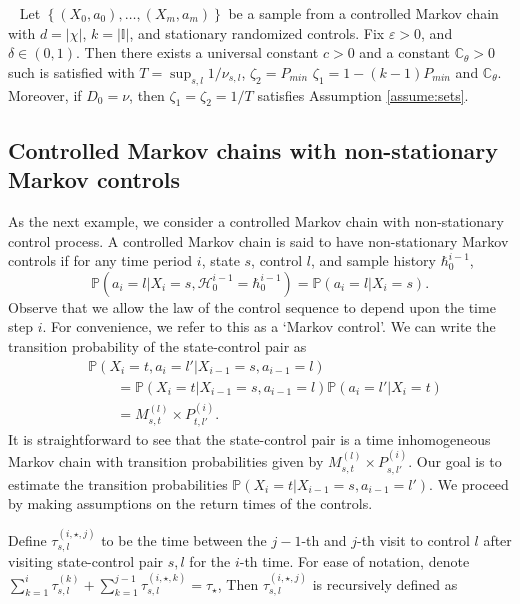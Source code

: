 \documentclass[opre,sglanonrev]{informs4}
\numberwithin{equation}{section}
\newcommand{\pow}[1]{^{(#1)}}
\newcommand{\lp}{\left(}
\newcommand{\rp}{\right)}
\newcommand{\History}{\mathcal{H}}
\newcommand{\history}{\hbar}
\newcommand{\Cbb}{\mathbb{C}}
\newcommand{\Ibb}{\mathbb{I}}
\newcommand{\Pbb}{\mathbb{P}}
\newcommand{\constant}{\Cbb}
\newcommand{\indexeddata}{\left\{(X_0,a_0),\dots,(X_m,a_m)\right\}}
\newcommand{\prob}{\Pbb}
\newcommand{\probl}{\prob}
\newcommand{\initialD}{D_0}
\newcommand{\eps}{\varepsilon}
\renewcommand{\epsilon}{\eps}
\begin{document}
{{\begin{proposition}~\label{prop:stationary-mdp}
Let $\indexeddata$ be a sample from a controlled Markov chain with $d = |\chi|$, $k = |\Ibb|$, and stationary randomized controls. 
Fix $\epsilon>0$, and $\delta \in (0,1)$. Then there exists a universal constant $c>0$ and a constant $\constant_\theta>0$ such  is satisfied with $T=\sup_{s,l} {1}/{\nu_{s,l}}$, $\zeta_2=P_{min}$ $\zeta_1=1-(k-1)P_{min}$ and $\constant_\theta$. Moreover, if $\initialD=\nu$, then $\zeta_1=\zeta_2=1/T$ satisfies Assumption \ref{assume:sets}.
\end{proposition}


\subsection{Controlled Markov chains with non-stationary Markov controls}\label{sec:exam-Markov}
As the next example, we consider a controlled Markov chain with non-stationary control process. A controlled Markov chain is said to have non-stationary Markov controls if for any time period $i$, state $s$, control $l$, and sample history $\history_0^{i-1}$,
\[
\probl\lp a_i=l|X_i=s,\History_0^{i-1}=\history_0^{i-1}\rp=\probl\lp a_i=l|X_i =s\rp.
\]
 Observe that we allow the law of the control sequence to depend upon the time step $i$. For convenience, we refer to this as a `Markov control'.
%
We can write the transition probability of the  state-control pair as
\begin{align*}
    &\prob\left(X_i=t,a_i=l'|X_{i-1}=s,a_{i-1}=l\right)\\
    & 
    \qquad = \prob\left(X_i=t|X_{i-1}=s,a_{i-1}=l\right)\prob(a_i=l'|X_i=t)
     \\
     & \qquad = M_{s,t}^{(l)}\times P_{t,l'}^{(i)}.
\end{align*}
It is straightforward to see that the state-control pair is a time inhomogeneous Markov chain with transition probabilities given by $M_{s,t}^{(l)}\times P_{s,l'}^{(i)}$. 
Our goal is to estimate the transition probabilities $\prob(X_i=t|X_{i-1}=s,a_{i-1}=l')$. We proceed by making assumptions on the return times of the controls.
\begin{definition}
Define $\tau_{s,l}\pow{i,\star,j}$ to be the time between the $j-1$-th and $j$-th visit to control $l$ after visiting state-control pair $s,l$ for the $i$-th time. For ease of notation, denote $ \sum_{k=1}^i\tau_{s,l}\pow{k}+\sum_{k=1}^{j-1}\tau^{(i,\star,k)}_{s,l}=\tau_\star$, Then $\tau_{s,l}\pow{i,\star,j}$ is recursively defined as

\end{definition}}}
\end{document}
